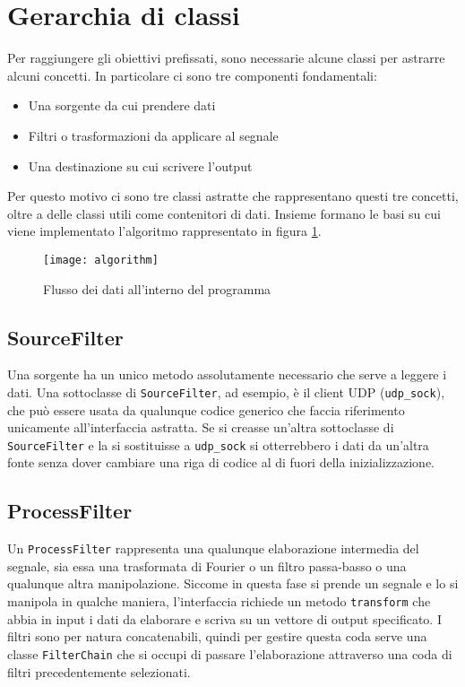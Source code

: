 \section{Gerarchia di classi}
Per raggiungere gli obiettivi prefissati, sono necessarie alcune classi per
astrarre alcuni concetti. In particolare ci sono tre componenti fondamentali:
\begin{itemize}
\item Una sorgente da cui prendere dati
\item Filtri o trasformazioni da applicare al segnale
\item Una destinazione su cui scrivere l'output
\end{itemize}
Per questo motivo ci sono tre classi astratte che rappresentano questi tre
concetti, oltre a delle classi utili come contenitori di dati. Insieme
formano le basi su cui viene implementato l'algoritmo rappresentato in
figura \ref{fig:algorithm}.
\begin{figure}[htb]
	\begin{center}
		\texttt{[image: algorithm]}
	\end{center}
	\caption{Flusso dei dati all'interno del programma}
	\label{fig:algorithm}
\end{figure}

\subsection{SourceFilter}
\label{sourcefilter}
Una sorgente ha un unico metodo assolutamente necessario che serve a leggere i
dati. Una sottoclasse di \texttt{SourceFilter}, ad esempio, \`e il client UDP
(\texttt{udp\_sock}), che pu\`o essere usata da qualunque codice generico che
faccia riferimento unicamente all'interfaccia astratta. Se si creasse un'altra
sottoclasse di \texttt{SourceFilter} e la si sostituisse a \texttt{udp\_sock} si
otterrebbero i dati da un'altra fonte senza dover cambiare una riga di codice al
di fuori della inizializzazione.
\subsection{ProcessFilter}
Un \texttt{ProcessFilter} rappresenta una qualunque elaborazione intermedia del
segnale, sia essa una trasformata di Fourier o un filtro passa-basso o una
qualunque altra manipolazione. Siccome in questa fase si prende un segnale e lo
si manipola in qualche maniera, l'interfaccia richiede un metodo
\texttt{transform} che abbia in input i dati da elaborare e scriva su un vettore
di output specificato. I filtri sono per natura concatenabili, quindi per
gestire questa coda serve una classe \texttt{FilterChain} che si occupi di
passare l'elaborazione attraverso una coda di filtri precedentemente
selezionati.
